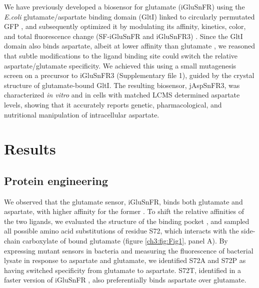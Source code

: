 We have previously developed a biosensor for glutamate (iGluSnFR) using the \textit{E.coli} glutamate/aspartate binding domain (GltI) linked to circularly permutated GFP \cite{Marvin2013-qq}, and subsequently optimized it by modulating its affinity, kinetics, color, and total fluorescence change (SF-iGluSnFR and iGluSnFR3) \cite{Marvin2018-ks, Aggarwal2023-pi}.
Since the GltI domain also binds aspartate, albeit at lower affinity than glutamate  \cite{Hu2008-nd}, we reasoned that subtle modifications to the ligand binding site could switch the relative aspartate/glutamate specificity.
We achieved this using a small mutagenesis screen on a precursor to iGluSnFR3 (Supplementary file 1), guided by the crystal structure of glutamate-bound GltI.
The resulting biosensor, jAspSnFR3, was characterized \textit{in vitro} and in cells with matched LCMS determined aspartate levels, showing that it accurately reports genetic, pharmacological, and nutritional manipulation of intracellular aspartate.




\section{Results}

\subsection{Protein engineering}
We observed that the glutamate sensor, iGluSnFR, binds both glutamate and aspartate, with higher affinity for the former \cite{Marvin2013-qq}.
To shift the relative affinities of the two ligands, we evaluated the structure of the binding pocket \cite{Hu2008-nd}, and sampled all possible amino acid substitutions of residue S72, which interacts with the side-chain carboxylate of bound glutamate (figure \ref{ch3:fig:Fig1}, panel A).
By expressing mutant sensors in bacteria and measuring the fluorescence of bacterial lysate in response to aspartate and glutamate, we identified S72A and S72P as having switched specificity from glutamate to aspartate.
S72T, identified in a faster version of iGluSnFR \cite{Helassa2018-fb}, also preferentially binds aspartate over glutamate.

